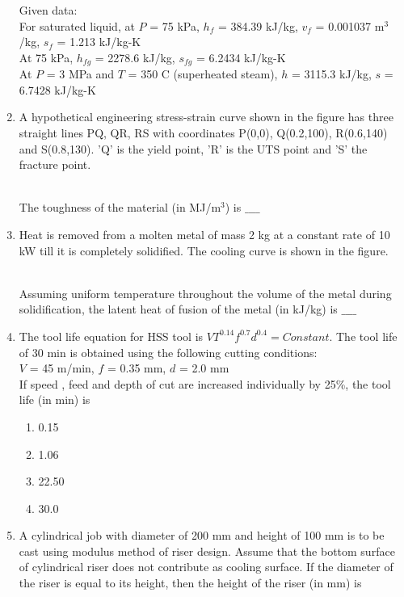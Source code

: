 \documentclass[journal]{IEEEtran}
\begin{document}
\begin{enumerate}
Given data: \\
For saturated liquid, at $P$ = 75 kPa, $h_f$ = 384.39 kJ/kg, $v_f$ = 0.001037 $\text{m}^3$/kg, $s_f$ = 1.213 kJ/kg-K \\
At 75 kPa, $h_{fg}$ = 2278.6 kJ/kg, $s_{fg}$ = 6.2434 kJ/kg-K \\
At $P$ = 3 MPa and $T$ = 350 \degree C (superheated steam), $h$ = 3115.3 kJ/kg,
$s$ = 6.7428 kJ/kg-K \\
\item A hypothetical engineering stress-strain curve shown in the figure has three straight lines PQ, QR, RS with coordinates P(0,0), Q(0.2,100), R(0.6,140) and S(0.8,130). 'Q' is the yield point, 'R' is the UTS point and 'S' the fracture point. 
\begin{figure}[!ht]
\centering
\resizebox{0.5\textwidth}{!}{%

}%
\end{figure} \\
The toughness of the material (in MJ/$\text{m}^3$) is $\_\_\_\_$ \\
\item Heat is removed from a molten metal of mass 2 kg at a constant rate of 10 kW till it is completely solidified. The cooling curve is shown in the figure.
\begin{figure}[!ht]
\centering
\resizebox{0.5\textwidth}{!}{%

}%
\end{figure} \\
Assuming uniform temperature throughout the volume of the metal during solidification, the latent heat of fusion of the metal (in kJ/kg) is $\_\_\_\_$ \\
\item The tool life equation for HSS tool is $VT^{0.14}f^{0.7}d^{0.4} = Constant$. The tool life  of 30 min is obtained using the following cutting conditions: \\
$V$ = 45 m/min, $f$ = 0.35 mm, $d$ = 2.0 mm \\
If speed , feed  and depth of cut  are increased individually by 25\%, the tool life (in min) is
\begin{enumerate}
    \item 0.15
    \item 1.06
    \item 22.50
    \item 30.0 \\
\end{enumerate}
\item A cylindrical job with diameter of 200 mm and height of 100 mm is to be cast using modulus method of riser design. Assume that the bottom surface of cylindrical riser does not contribute as cooling surface. If the diameter of the riser is equal to its height, then the height of the riser (in mm) is

\end{enumerate}
\end{document}
